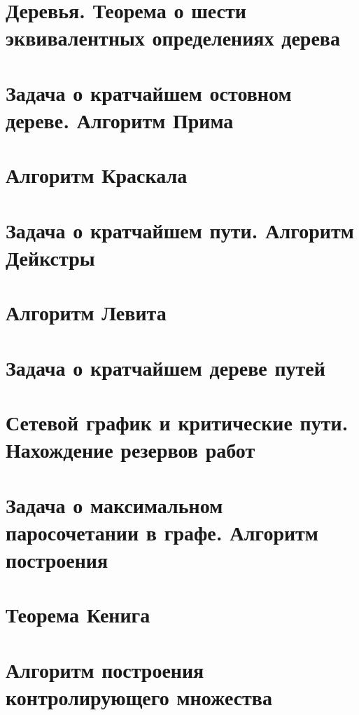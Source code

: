 \documentclass[12pt, fleqn]{article}
\begin{document}

\newpage

\section{Деревья. Теорема о шести эквивалентных определениях дерева}

\newpage

\section{Задача о кратчайшем остовном дереве. Алгоритм Прима}
\newpage

\section{Алгоритм Краскала}
\newpage

\section{Задача о кратчайшем пути. Алгоритм Дейкстры}
\newpage

\section{Алгоритм Левита}

\newpage

\section{Задача о кратчайшем дереве путей}

\newpage

\section{Сетевой график и критические пути. Нахождение резервов работ}
\newpage

\section{Задача о максимальном паросочетании в графе. Алгоритм построения}

\newpage

\section{Теорема Кенига}

\newpage

\section{Алгоритм построения контролирующего множества}
\newpage
\end{document}
